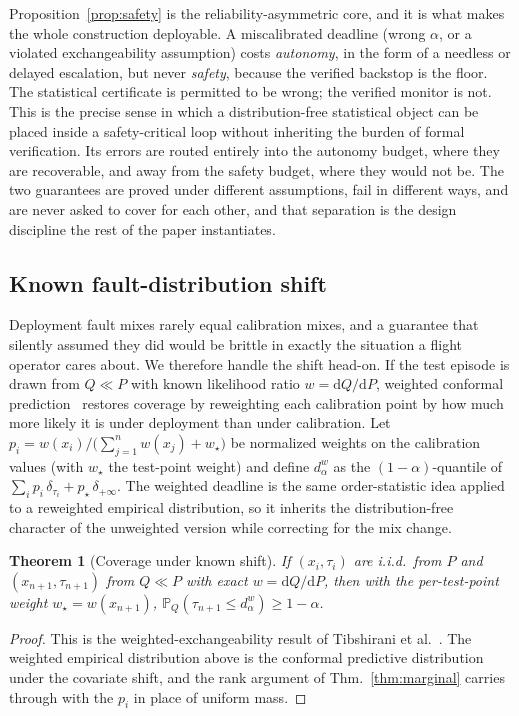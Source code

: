\documentclass[journal]{IEEEtran}
\theoremstyle{plain}
\newtheorem{theorem}{Theorem}
\theoremstyle{definition}
\newcommand{\Prob}{\mathbb{P}}
\newcommand{\dalpha}{d_{\alpha}}
\begin{document}
Proposition~\ref{prop:safety} is the reliability-asymmetric core, and it is what makes the
whole construction deployable. A miscalibrated deadline
(wrong $\alpha$, or a violated exchangeability assumption) costs \emph{autonomy}, in the form
of a needless or delayed escalation, but never \emph{safety}, because the verified backstop
is the floor. The statistical certificate is permitted to be wrong; the verified monitor is
not. This is the precise sense in which a distribution-free statistical object can be placed
inside a safety-critical loop without inheriting the burden of formal verification. Its
errors are routed entirely into the autonomy budget, where they are recoverable, and away
from the safety budget, where they would not be. The two guarantees are proved under
different assumptions, fail in different ways, and are never asked to cover for each other,
and that separation is the design discipline the rest of the paper instantiates.

\subsection{Known fault-distribution shift} Deployment fault mixes rarely equal calibration
mixes, and a guarantee that silently assumed they did would be brittle in exactly the
situation a flight operator cares about. We therefore handle the shift head-on. If the test
episode is drawn from $Q\ll P$ with known likelihood ratio
$w=\mathrm{d}Q/\mathrm{d}P$, weighted conformal prediction~\cite{Tibshirani2019} restores
coverage by reweighting each calibration point by how much more likely it is under
deployment than under calibration. Let $p_i = w(x_i)/\big(\sum_{j=1}^n w(x_j)+w_{\star}\big)$
be normalized weights on
the calibration values (with $w_\star$ the test-point weight) and define $\dalpha^{w}$ as the
$(1-\alpha)$-quantile of $\sum_i p_i\,\delta_{\tau_i} + p_\star\,\delta_{+\infty}$. The
weighted deadline is the same order-statistic idea applied to a reweighted empirical
distribution, so it inherits the distribution-free character of the unweighted version while
correcting for the mix change.

\begin{theorem}[Coverage under known shift]
\label{thm:weighted}
If $(x_i,\tau_i)$ are i.i.d.\ from $P$ and $(x_{n+1},\tau_{n+1})$ from $Q\ll P$ with exact
$w=\mathrm{d}Q/\mathrm{d}P$, then with the per-test-point weight $w_\star=w(x_{n+1})$,
$\Prob_{Q}(\tau_{n+1}\le \dalpha^{w}) \ge 1-\alpha$.
\end{theorem}
\begin{proof}
This is the weighted-exchangeability result of Tibshirani et al.~\cite{Tibshirani2019}. The
weighted empirical distribution above is the conformal predictive distribution under the
covariate shift, and the rank argument of Thm.~\ref{thm:marginal} carries through with the
$p_i$ in place of uniform mass.
\end{proof}
\end{document}
